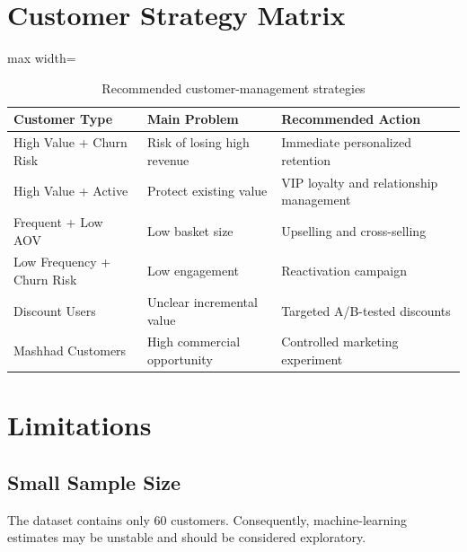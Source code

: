 \documentclass[11pt,a4paper]{article}
\begin{document}
\section{Customer Strategy Matrix}

\begin{table}[H]
\centering
\caption{Recommended customer-management strategies}
\label{tab:strategy}
\begin{adjustbox}{max width=\textwidth}
\begin{tabular}{p{3.3cm}p{4cm}p{5cm}}
\toprule
\textbf{Customer Type} &
\textbf{Main Problem} &
\textbf{Recommended Action}\\
\midrule
High Value + Churn Risk &
Risk of losing high revenue &
Immediate personalized retention\\

High Value + Active &
Protect existing value &
VIP loyalty and relationship management\\

Frequent + Low AOV &
Low basket size &
Upselling and cross-selling\\

Low Frequency + Churn Risk &
Low engagement &
Reactivation campaign\\

Discount Users &
Unclear incremental value &
Targeted A/B-tested discounts\\

Mashhad Customers &
High commercial opportunity &
Controlled marketing experiment\\
\bottomrule
\end{tabular}
\end{adjustbox}
\end{table}


\section{Limitations}

\subsection{Small Sample Size}

The dataset contains only 60 customers. Consequently, machine-learning estimates may be unstable and should be considered exploratory.
\end{document}
